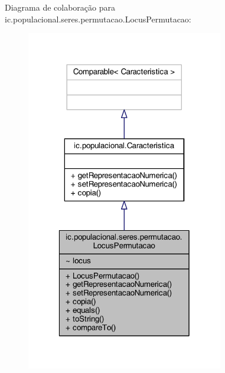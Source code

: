 Diagrama de colaboração para ic.\-populacional.\-seres.\-permutacao.\-Locus\-Permutacao\-:
\nopagebreak
\begin{figure}[H]
\begin{center}
\leavevmode
\includegraphics[width=244pt]{classic_1_1populacional_1_1seres_1_1permutacao_1_1_locus_permutacao__coll__graph}
\end{center}
\end{figure}
